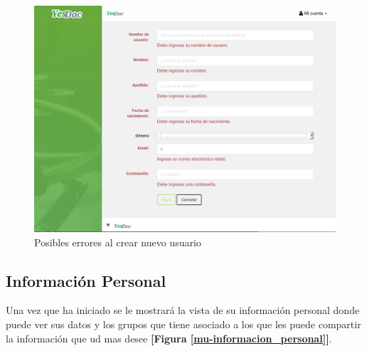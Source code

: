  \begin{figure}
 	\centering
 	\includegraphics[width=.8\textwidth]{img/manual_de_usuario/nuevo_usuario}
 	\caption{Posibles errores al crear nuevo usuario}
 	\label{mu-nuevo_usuario}
 \end{figure}


\subsection{Información Personal} 
Una vez que ha iniciado se le mostrará la vista de su información personal donde puede ver sus datos y los grupos que tiene asociado a los que les puede compartir la información que ud mas desee \textbf{[Figura \ref{mu-informacion_personal}]}. 

